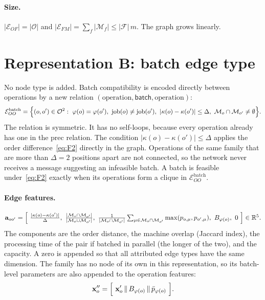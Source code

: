 \documentclass[11pt,a4paper]{article}
\newcommand{\Oset}{\mathcal{O}}
\newcommand{\Mset}{\mathcal{M}}
\newcommand{\Fset}{\mathcal{F}}
\newcommand{\Eset}{\mathcal{E}}
\newcommand{\job}{\operatorname{job}}
\newcommand{\cat}{\,\Vert\,}
\newcommand{\R}{\mathbb{R}}
\begin{document}
\paragraph{Size.} $|\Eset_{OF}|=|\Oset|$ and $|\Eset_{FM}|=\sum_f|\Mset_f|\le|\Fset|\,m$. The graph grows linearly.

\section{Representation B: batch edge type}
\label{sec:repB}

No node type is added. Batch compatibility is encoded directly between operations
by a new relation $(\text{operation},\textsf{batch},\text{operation})$:
\begin{equation}
  \Eset_{OO}^{\mathrm{batch}}=\Bigl\{(o,o')\in\Oset^2:\
  \varphi(o)=\varphi(o'),\ \job(o)\neq\job(o'),\
  |\kappa(o)-\kappa(o')|\le\Delta,\
  \Mset_o\cap\Mset_{o'}\neq\emptyset\Bigr\}.
  \label{eq:Ebatch}
\end{equation}
The relation is symmetric. It has no self-loops, because every operation already
has one in the \textsf{prec} relation. The condition $|\kappa(o)-\kappa(o')|\le\Delta$ applies the order
difference~\eqref{eq:F2} directly in the graph. Operations of the same family that
are more than $\Delta=2$ positions apart are not connected, so the network never
receives a message suggesting an infeasible batch. A batch is feasible
under~\eqref{eq:F2} exactly when its operations form a clique in
$\Eset_{OO}^{\mathrm{batch}}$.

\paragraph{Edge features.}
\begin{equation}
  \mathbf{a}_{oo'}=\Bigl[\
  \tfrac{|\kappa(o)-\kappa(o')|}{\Delta},\
  \tfrac{|\Mset_o\cap\Mset_{o'}|}{|\Mset_o\cup\Mset_{o'}|},\
  \tfrac{1}{|\Mset_o\cap\Mset_{o'}|}\textstyle\sum_{\mu\in\Mset_o\cap\Mset_{o'}}\max(p_{o,\mu},p_{o',\mu}),\
  B_{\varphi(o)},\ 0\ \Bigr]\in\R^5.
\end{equation}
The components are the order distance, the machine overlap (Jaccard index), the
processing time of the pair if batched in parallel (the longer of the two), and
the capacity. A zero is appended so that all attributed edge types have the same
dimension. The family has no node of its own in this representation, so its
batch-level parameters are also appended to the operation features:
\begin{equation}
  \mathbf{x}''_o=\Bigl[\ \mathbf{x}'_o \cat B_{\varphi(o)} \cat \bar p_{\varphi(o)}\ \Bigr].
\end{equation}
\end{document}
